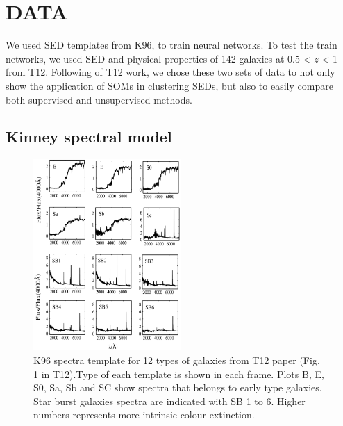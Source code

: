 
\section{DATA}
\label{sec: data}
We used SED templates from K96, to train neural networks.
To test the train networks, we used SED and physical properties of 142 galaxies at 0.5 < $z$ < 1 from T12.
Following of T12 work, we chose these two sets of data to not only show the application of SOMs in clustering SEDs, but also to easily compare both supervised and unsupervised methods.

 \subsection{Kinney spectral model}
     \begin{figure}
        \centering
        \includegraphics[width=0.5\textwidth]{../images/k96.jpg}
        \caption{K96 spectra template for 12 types of galaxies from T12 paper (Fig. 1 in T12).Type of each template is shown in each frame. Plots B, E, S0, Sa, Sb and SC show spectra that belongs to early type galaxies. Star burst galaxies spectra are indicated with SB 1 to 6. Higher numbers represents more intrinsic colour extinction.}
        \label{fig: k96}
    \end{figure}
      
